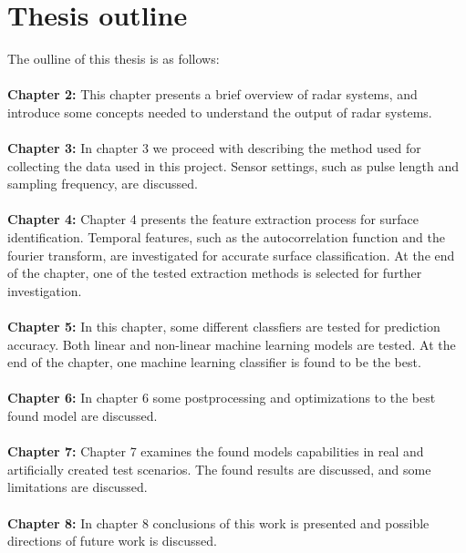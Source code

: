 


\section{Thesis outline}

The oulline of this thesis is as follows:
\\ \\
\noindent\textbf{Chapter 2:} This chapter presents a brief overview of radar systems, and introduce some concepts needed to understand the output of radar systems. 
\\ \\
\noindent\textbf{Chapter 3:} In chapter 3 we proceed with describing the method used for collecting the data used in this project. Sensor settings, such as pulse length and sampling frequency, are discussed. 
\\ \\
\noindent\textbf{Chapter 4:} Chapter 4 presents the feature extraction process for surface identification. Temporal features, such as the autocorrelation function and the fourier transform, are investigated for accurate surface classification. At the end of the chapter, one of the tested extraction methods is selected for further investigation. 
\\ \\
\noindent\textbf{Chapter 5:}  In this chapter, some different classfiers are tested for prediction accuracy. Both linear and non-linear machine learning models are tested. At the end of the chapter, one machine learning classifier is found to be the best. 
\\ \\
\noindent\textbf{Chapter 6:} In chapter 6 some postprocessing and optimizations to the best found model are discussed. 
\\ \\
\noindent\textbf{Chapter 7:} Chapter 7 examines the found models capabilities in real and artificially created test scenarios. The found results are discussed, and some limitations are discussed.
\\ \\
\noindent\textbf{Chapter 8:} In chapter 8 conclusions of this work is presented and possible directions of future work is discussed. 








